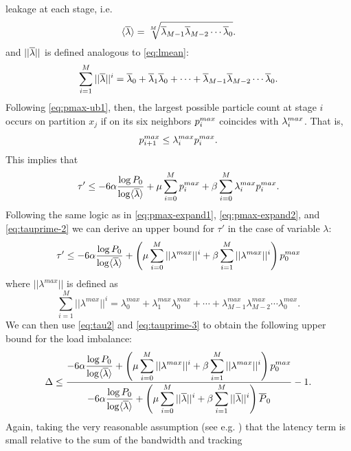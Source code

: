 leakage at each stage, i.e.
\begin{equation*}
    \langle \overline{\lambda} \rangle = \sqrt[M]{\overline{\lambda}_{M-1}\overline{\lambda}_{M-2} \dotsm
      \overline{\lambda}_{0}}.
\end{equation*}
and $||\overline{\lambda}||$ is defined analogous to \eqref{eq:lmean}:
\begin{equation*}
  \sum_{i=1}^M ||\overline{\lambda}||^i = \overline{\lambda}_0 + \overline{\lambda}_1 \overline{\lambda}_0 + \dotsb + \overline{\lambda}_{M-1}
  \overline{\lambda}_{M-2} \dotsm \overline{\lambda}_0.
\end{equation*}
Following \eqref{eq:pmax-ub1}, then, the largest possible particle count at
stage $i$ occurs on partition $x_j$ if on its six neighbors ${p_i^{max}}$ coincides
with ${\lambda_i^{max}}$. That is,
\begin{equation}
  \label{eq:ub2}
  p_{i+1}^{max} \le {\lambda_i^{max}} p_i^{max}.
\end{equation}
This implies that
\begin{equation}
  \tau' \le -6\alpha\frac{\log P_0}{\log \langle \overline{\lambda} \rangle} + \mu \sum_{i=0}^M {p_i^{max}}
  \nonumber + \beta \sum_{i=0}^{M} {\lambda_i^{max}} {p_i^{max}}.
\end{equation}
Following the same logic as in \eqref{eq:pmax-expand1}, \eqref{eq:pmax-expand2},
and \eqref{eq:tauprime-2} we can derive an upper bound for $\tau'$ in the case
of variable $\lambda$:
\begin{equation}
  \label{eq:tauprime-3}
  \tau' \le -6 \alpha \frac{\log P_0}{\log \langle \overline{\lambda} \rangle} + \left( \mu \sum_{i=0}^M
  ||\lambda^{max}||^i + \beta \sum_{i=1}^M ||\lambda^{max}||^i \right )
  p_0^{max}
\end{equation}
where $||\lambda^{max}||$ is defined as
\begin{equation*}
  \sum_{i=1}^M ||\lambda^{max}||^i = \lambda^{max}_0 + \lambda^{max}_1
  \lambda^{max}_0 + \dotsb + \lambda^{max}_{M-1} \lambda^{max}_{M-2} \dotsm
  \lambda^{max}_0.
\end{equation*}
We can then use \eqref{eq:tau2} and \eqref{eq:tauprime-3} to obtain the
following upper bound for the load imbalance:
\begin{equation}
  \label{eq:delta4}
  \Delta \le \frac{\displaystyle -6 \alpha \frac{\log P_0}{\log \langle \overline{\lambda} \rangle} + \left(
    \mu \sum_{i=0}^M ||\lambda^{max}||^i + \beta \sum_{i=1}^M
    ||\lambda^{max}||^i \right ) p_0^{max}}{\displaystyle -6 \alpha \frac{\log
      P_0}{\log \langle \overline{\lambda} \rangle} + \left ( \mu \sum_{i=0}^M ||\overline{\lambda}||^i +
    \beta\sum_{i=1}^M ||\overline{\lambda}||^i \right ) \overline{P}_0} - 1.
\end{equation}
Again, taking the very reasonable assumption (see e.g. \cite{jcp-siegel-2012-1})
that the latency term is small relative to the sum of the bandwidth and tracking
